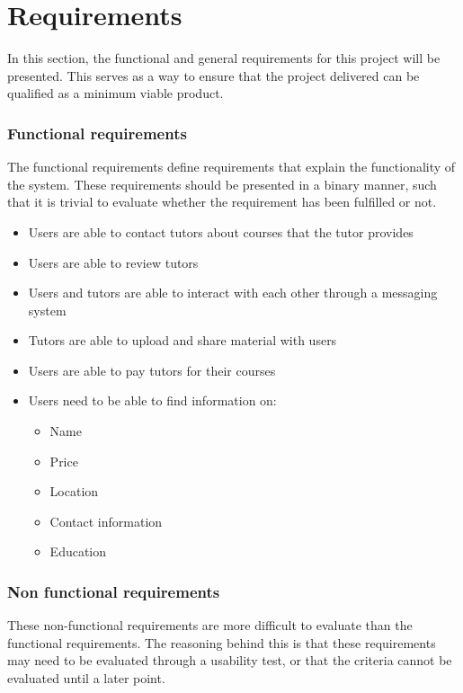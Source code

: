 \section{Requirements}
In this section, the functional and general requirements for this project will be presented.
This serves as a way to ensure that the project delivered can be qualified as a minimum viable product.

\subsubsection{Functional requirements}
The functional requirements define requirements that explain the functionality of the system. 
These requirements should be presented in a binary manner, such that it is trivial to evaluate whether the requirement has been fulfilled or not.

\begin{itemize}
    \item Users are able to contact tutors about courses that the tutor provides
    \item Users are able to review tutors
    \item Users and tutors are able to interact with each other through a messaging system
    \item Tutors are able to upload and share material with users
    \item Users are able to pay tutors for their courses
    \item Users need to be able to find information on:
    \begin{itemize}
        \item Name
        \item Price
        \item Location
        \item Contact information
        \item Education
    \end{itemize}
\end{itemize}

\subsubsection{Non functional requirements}
These non-functional requirements are more difficult to evaluate than the functional requirements.
The reasoning behind this is that these requirements may need to be evaluated through a usability test, or that the criteria cannot be evaluated until a later point. 


